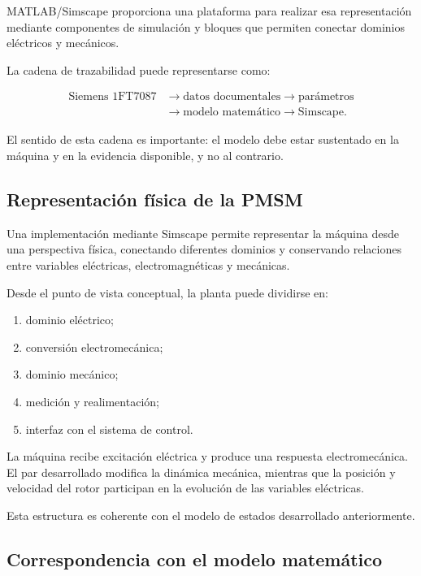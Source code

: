 MATLAB/Simscape proporciona una plataforma para realizar esa representación mediante componentes de simulación y bloques que permiten conectar dominios eléctricos y mecánicos.

La cadena de trazabilidad puede representarse como:

\begin{equation}
\begin{aligned}
\text{Siemens 1FT7087}
&\rightarrow \text{datos documentales}
\rightarrow \text{parámetros}
\\
&\rightarrow \text{modelo matemático}
\rightarrow \text{Simscape}.
\end{aligned}
\end{equation}

El sentido de esta cadena es importante: el modelo debe estar sustentado en la máquina y en la evidencia disponible, y no al contrario.

\subsection{Representación física de la PMSM}

Una implementación mediante Simscape permite representar la máquina desde una perspectiva física, conectando diferentes dominios y conservando relaciones entre variables eléctricas, electromagnéticas y mecánicas.

Desde el punto de vista conceptual, la planta puede dividirse en:

\begin{enumerate}
    \item dominio eléctrico;
    \item conversión electromecánica;
    \item dominio mecánico;
    \item medición y realimentación;
    \item interfaz con el sistema de control.
\end{enumerate}

La máquina recibe excitación eléctrica y produce una respuesta electromecánica. El par desarrollado modifica la dinámica mecánica, mientras que la posición y velocidad del rotor participan en la evolución de las variables eléctricas.

Esta estructura es coherente con el modelo de estados desarrollado anteriormente.

\subsection{Correspondencia con el modelo matemático}

